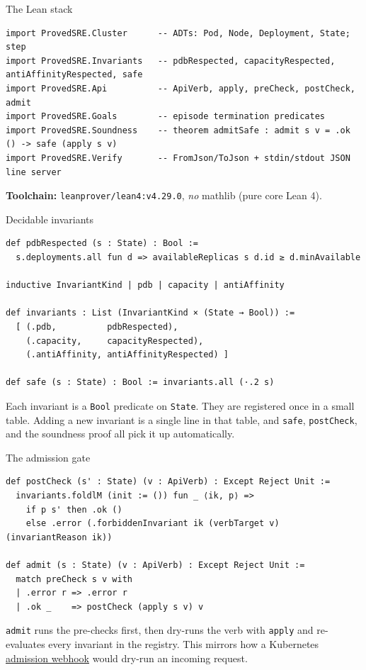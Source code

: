 \documentclass[10pt,aspectratio=169]{beamer}
\begin{document}
\begin{frame}[fragile]{The Lean stack}
\begin{lstlisting}
import ProvedSRE.Cluster      -- ADTs: Pod, Node, Deployment, State; step
import ProvedSRE.Invariants   -- pdbRespected, capacityRespected, antiAffinityRespected, safe
import ProvedSRE.Api          -- ApiVerb, apply, preCheck, postCheck, admit
import ProvedSRE.Goals        -- episode termination predicates
import ProvedSRE.Soundness    -- theorem admitSafe : admit s v = .ok () -> safe (apply s v)
import ProvedSRE.Verify       -- FromJson/ToJson + stdin/stdout JSON line server
\end{lstlisting}
\vspace{0.4em}
\textbf{Toolchain:} \texttt{leanprover/lean4:v4.29.0}, \emph{no} mathlib (pure core Lean 4).
\end{frame}

\begin{frame}[fragile]{Decidable invariants}
\begin{lstlisting}
def pdbRespected (s : State) : Bool :=
  s.deployments.all fun d => availableReplicas s d.id ≥ d.minAvailable

inductive InvariantKind | pdb | capacity | antiAffinity

def invariants : List (InvariantKind × (State → Bool)) :=
  [ (.pdb,          pdbRespected),
    (.capacity,     capacityRespected),
    (.antiAffinity, antiAffinityRespected) ]

def safe (s : State) : Bool := invariants.all (·.2 s)
\end{lstlisting}
\vspace{0.4em}
\small Each invariant is a \texttt{Bool} predicate on \texttt{State}. They are registered once in a small table. Adding a new invariant is a single line in that table, and \texttt{safe}, \texttt{postCheck}, and the soundness proof all pick it up automatically.
\end{frame}

\begin{frame}[fragile]{The admission gate}
\begin{lstlisting}
def postCheck (s' : State) (v : ApiVerb) : Except Reject Unit :=
  invariants.foldlM (init := ()) fun _ ⟨ik, p⟩ =>
    if p s' then .ok ()
    else .error (.forbiddenInvariant ik (verbTarget v) (invariantReason ik))

def admit (s : State) (v : ApiVerb) : Except Reject Unit :=
  match preCheck s v with
  | .error r => .error r
  | .ok _    => postCheck (apply s v) v
\end{lstlisting}
\vspace{0.4em}
\small \texttt{admit} runs the pre-checks first, then dry-runs the verb with \texttt{apply} and re-evaluates every invariant in the registry. This mirrors how a Kubernetes \hyperlink{glossary}{admission webhook} would dry-run an incoming request.
\end{frame}
\end{document}
